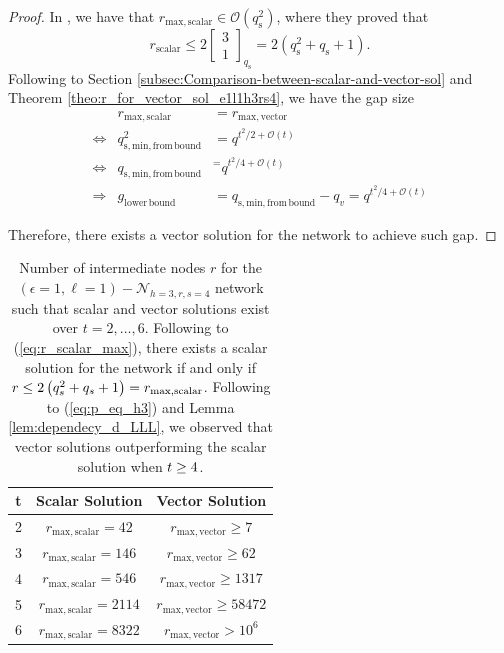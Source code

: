 \begin{proof}
In \cite[Sec. VIII-C]{Wachter-Zeh:2018}, we have that $r_{\mathrm{max,scalar}}\in\mathcal{O}\left(q_{\mathrm{s}}^{2}\right)$,
where they proved that
\begin{equation}
r_{\mathrm{scalar}}\leq2\left[\begin{array}{c}
3\\
1
\end{array}\right]_{q_{\mathrm{s}}}=2\left(q_{\mathrm{s}}^{2}+q_{\mathrm{s}}+1\right).\label{eq:r_scalar_max}
\end{equation}
Following to Section \ref{subsec:Comparison-between-scalar-and-vector-sol}
and Theorem \ref{theo:r_for_vector_sol_e1l1h3rs4}, we have the gap
size 
\begin{eqnarray}
 & r_{\mathrm{max,scalar}} & =r_{\mathrm{max,vector}}\nonumber \\
\Leftrightarrow & q_{\mathrm{s,min,from\,bound}}^{2} & =q^{t^{2}/2+\mathcal{O}(t)}\nonumber \\
\Leftrightarrow & q_{\mathrm{s,min,from\,bound}} & ^{=}q^{t^{2}/4+\mathcal{O}(t)}\nonumber \\
\Rightarrow & g_{\mathrm{lower\,bound}} & =q_{\mathrm{s,min,from\,bound}}-q_{v}=q^{t^{2}/4+\mathcal{O}(t)}\label{eq:gap_e1l1h3rs4}
\end{eqnarray}

Therefore, there exists a vector solution for the network to achieve
such gap.
\end{proof}
\begin{table}[H]
\begin{centering}
\begin{tabular}{|c|c|c|}
\hline 
t & Scalar Solution & Vector Solution\tabularnewline
\hline 
\hline 
2 & $r_{\mathrm{max,scalar}}=42$ & $r_{\mathrm{max,vector}}\geq7$\tabularnewline
\hline 
3 & $r_{\mathrm{max,scalar}}=146$ & $r_{\mathrm{max,vector}}\geq62$ \tabularnewline
\hline 
4 & $r_{\mathrm{max,scalar}}=546$ & $r_{\mathrm{max,vector}}\geq1317$\tabularnewline
\hline 
5 & $r_{\mathrm{max,scalar}}=2114$ & $r_{\mathrm{max,vector}}\geq58472$\tabularnewline
\hline 
6 & $r_{\mathrm{max,scalar}}=8322$ & $r_{\mathrm{max,vector}}>10^{6}$\tabularnewline
\hline 
\end{tabular}
\par\end{centering}
\centering{}\caption{Number of intermediate nodes $r$ for the $\left(\epsilon=1,\ell=1\right)-\mathcal{N}_{h=3,r,s=4}$
network such that scalar and vector solutions exist over $t=2,\ldots,6$.
Following to (\ref{eq:r_scalar_max}), there exists a scalar solution
for the network if and only if $r\protect\leq2\left(q_{s}^{2}+q_{s}+1\right)=r_{\mathrm{max,scalar}}$.
Following to (\ref{eq:p_eq_h3}) and Lemma \ref{lem:dependecy_d_LLL},
we observed that vector solutions outperforming the scalar solution
when $t\protect\geq4$. \label{tab:r_over_t}}
\end{table}

